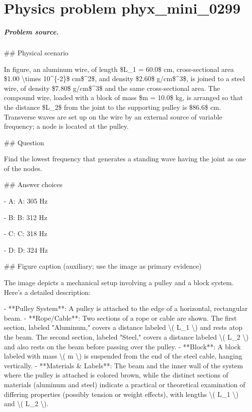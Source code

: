 
\chapter{Physics problem phyx\_mini\_0299}
\label{ch:PhyXMiniProblems_problem_phyx_mini_0299}

\paragraph{Problem source.}
\#\# Physical scenario

In figure, an aluminum wire, of length \$L\_1 = 60.0\$ cm, cross-sectional area \$1.00 \textbackslash{}times 10\textasciicircum{}\{-2\}\$ cm\$\textasciicircum{}2\$, and density \$2.60\$ g/cm\$\textasciicircum{}3\$, is joined to a steel wire, of density \$7.80\$ g/cm\$\textasciicircum{}3\$ and the same cross-sectional area. The compound wire, loaded with a block of mass \$m = 10.0\$ kg, is arranged so that the distance \$L\_2\$ from the joint to the supporting pulley is \$86.6\$ cm. Transverse waves are set up on the wire by an external source of variable frequency; a node is located at the pulley.

\#\# Question

Find the lowest frequency that generates a standing wave having the joint as one of the nodes.

\#\# Answer choices

- A: A: 305 Hz

- B: B: 312 Hz

- C: C: 318 Hz

- D: D: 324 Hz

\#\# Figure caption (auxiliary; use the image as primary evidence)

The image depicts a mechanical setup involving a pulley and a block system. Here's a detailed description:

- **Pulley System**: A pulley is attached to the edge of a horizontal, rectangular beam.
- **Rope/Cable**: Two sections of a rope or cable are shown. The first section, labeled "Aluminum," covers a distance labeled \textbackslash{}( L\_1 \textbackslash{}) and rests atop the beam. The second section, labeled "Steel," covers a distance labeled \textbackslash{}( L\_2 \textbackslash{}) and also rests on the beam before passing over the pulley.
- **Block**: A block labeled with mass \textbackslash{}( m \textbackslash{}) is suspended from the end of the steel cable, hanging vertically.
- **Materials \& Labels**: The beam and the inner wall of the system where the pulley is attached is colored brown, while the distinct sections of materials (aluminum and steel) indicate a practical or theoretical examination of differing properties (possibly tension or weight effects), with lengths \textbackslash{}( L\_1 \textbackslash{}) and \textbackslash{}( L\_2 \textbackslash{}).
  
